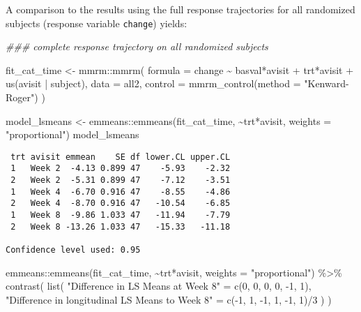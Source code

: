 \documentclass[
  letterpaper,
  DIV=11,
  numbers=noendperiod]{scrreprt}
\newenvironment{Shaded}{\begin{snugshade}}{\end{snugshade}}
\newcommand{\AttributeTok}[1]{\textcolor[rgb]{0.40,0.45,0.13}{#1}}
\newcommand{\DecValTok}[1]{\textcolor[rgb]{0.68,0.00,0.00}{#1}}
\newcommand{\DocumentationTok}[1]{\textcolor[rgb]{0.37,0.37,0.37}{\textit{#1}}}
\newcommand{\FunctionTok}[1]{\textcolor[rgb]{0.28,0.35,0.67}{#1}}
\newcommand{\NormalTok}[1]{\textcolor[rgb]{0.00,0.23,0.31}{#1}}
\newcommand{\OtherTok}[1]{\textcolor[rgb]{0.00,0.23,0.31}{#1}}
\newcommand{\SpecialCharTok}[1]{\textcolor[rgb]{0.37,0.37,0.37}{#1}}
\newcommand{\StringTok}[1]{\textcolor[rgb]{0.13,0.47,0.30}{#1}}
\begin{document}
A comparison to the results using the full response trajectories for all
randomized subjects (response variable \texttt{change}) yields:

\begin{Shaded}
\begin{Highlighting}[]
\DocumentationTok{\#\#\# complete response trajectory on all randomized subjects}

\NormalTok{fit\_cat\_time }\OtherTok{\textless{}{-}}\NormalTok{ mmrm}\SpecialCharTok{::}\FunctionTok{mmrm}\NormalTok{(}
  \AttributeTok{formula =}\NormalTok{ change }\SpecialCharTok{\textasciitilde{}}\NormalTok{ basval}\SpecialCharTok{*}\NormalTok{avisit }\SpecialCharTok{+}\NormalTok{ trt}\SpecialCharTok{*}\NormalTok{avisit }\SpecialCharTok{+} \FunctionTok{us}\NormalTok{(avisit }\SpecialCharTok{|}\NormalTok{ subject),}
  \AttributeTok{data =}\NormalTok{ all2,}
  \AttributeTok{control =} \FunctionTok{mmrm\_control}\NormalTok{(}\AttributeTok{method =} \StringTok{"Kenward{-}Roger"}\NormalTok{)}
\NormalTok{)}

\NormalTok{model\_lsmeans }\OtherTok{\textless{}{-}}\NormalTok{ emmeans}\SpecialCharTok{::}\FunctionTok{emmeans}\NormalTok{(fit\_cat\_time, }\SpecialCharTok{\textasciitilde{}}\NormalTok{trt}\SpecialCharTok{*}\NormalTok{avisit, }\AttributeTok{weights =} \StringTok{"proportional"}\NormalTok{)}
\NormalTok{model\_lsmeans}
\end{Highlighting}
\end{Shaded}

\begin{verbatim}
 trt avisit emmean    SE df lower.CL upper.CL
 1   Week 2  -4.13 0.899 47    -5.93    -2.32
 2   Week 2  -5.31 0.899 47    -7.12    -3.51
 1   Week 4  -6.70 0.916 47    -8.55    -4.86
 2   Week 4  -8.70 0.916 47   -10.54    -6.85
 1   Week 8  -9.86 1.033 47   -11.94    -7.79
 2   Week 8 -13.26 1.033 47   -15.33   -11.18

Confidence level used: 0.95 
\end{verbatim}

\begin{Shaded}
\begin{Highlighting}[]
\NormalTok{emmeans}\SpecialCharTok{::}\FunctionTok{emmeans}\NormalTok{(fit\_cat\_time, }\SpecialCharTok{\textasciitilde{}}\NormalTok{trt}\SpecialCharTok{*}\NormalTok{avisit, }\AttributeTok{weights =} \StringTok{"proportional"}\NormalTok{) }\SpecialCharTok{\%\textgreater{}\%} 
  \FunctionTok{contrast}\NormalTok{(}
    \FunctionTok{list}\NormalTok{(}
      \StringTok{"Difference in LS Means at Week 8"} \OtherTok{=} \FunctionTok{c}\NormalTok{(}\DecValTok{0}\NormalTok{, }\DecValTok{0}\NormalTok{, }\DecValTok{0}\NormalTok{, }\DecValTok{0}\NormalTok{, }\SpecialCharTok{{-}}\DecValTok{1}\NormalTok{, }\DecValTok{1}\NormalTok{),}
      \StringTok{"Difference in longitudinal LS Means to Week 8"} \OtherTok{=} \FunctionTok{c}\NormalTok{(}\SpecialCharTok{{-}}\DecValTok{1}\NormalTok{, }\DecValTok{1}\NormalTok{, }\SpecialCharTok{{-}}\DecValTok{1}\NormalTok{, }\DecValTok{1}\NormalTok{, }\SpecialCharTok{{-}}\DecValTok{1}\NormalTok{, }\DecValTok{1}\NormalTok{)}\SpecialCharTok{/}\DecValTok{3}
\NormalTok{    )}
\NormalTok{  )}
\end{Highlighting}
\end{Shaded}
\end{document}
